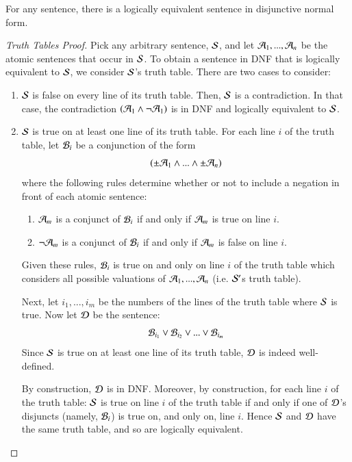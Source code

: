 \documentclass[12pt, a4paper, oneside, openright, titlepage]{book}
\begin{document}
\begin{namthm}
    For any sentence, there is a logically equivalent sentence in disjunctive normal form.
\end{namthm}
\begin{proof}[Truth Tables Proof]
    Pick any arbitrary sentence, $\mathcal{S}$, and let $\mathcal{A}_1,...,\mathcal{A}_n$ be the atomic sentences that occur in $\mathcal{S}$. To obtain a sentence in DNF that is logically equivalent to $\mathcal{S}$, we consider $\mathcal{S}$'s truth table. There are two cases to consider: \begin{enumerate}
        \item $\mathcal{S}$ is false on every line of its truth table. Then, $\mathcal{S}$ is a contradiction. In that case, the contradiction $(\mathcal{A}_1\wedge\neg\mathcal{A}_1)$ is in DNF and logically equivalent to $\mathcal{S}$.
        \item $\mathcal{S}$ is true on at least one line of its truth table. For each line $i$ of the truth table, let $\mathcal{B}_i$ be a conjunction of the form \begin{equation*}
                (\pm\mathcal{A}_1\wedge...\wedge\pm\mathcal{A}_n)
        \end{equation*}
            where the following rules determine whether or not to include a negation in front of each atomic sentence: \begin{enumerate}
                \item $\mathcal{A}_m$ is a conjunct of $\mathcal{B}_i$ if and only if $\mathcal{A}_m$ is true on line $i$.
                \item $\neg \mathcal{A}_m$ is a conjunct of $\mathcal{B}_i$ if and only if $\mathcal{A}_m$ is false on line $i$.
            \end{enumerate}
            Given these rules, $\mathcal{B}_i$ is true on and only on line $i$ of the truth table which considers all possible valuations of $\mathcal{A}_1,...,\mathcal{A}_n$ (i.e. $\mathcal{S}'$s truth table).

            Next, let $i_1,...,i_m$ be the numbers of the lines of the truth table where $\mathcal{S}$ is true. Now let $\mathcal{D}$ be the sentence: \begin{equation*}
                \mathcal{B}_{i_1}\vee\mathcal{B}_{i_2}\vee ...\vee \mathcal{B}_{i_m}
            \end{equation*}
            Since $\mathcal{S}$ is true on at least one line of its truth table, $\mathcal{D}$ is indeed well-defined. 


            By construction, $\mathcal{D}$ is in DNF. Moreover, by construction, for each line $i$ of the truth table: $\mathcal{S}$ is true on line $i$ of the truth table if and only if one of $\mathcal{D}$'s disjuncts (namely, $\mathcal{B}_i$) is true on, and only on, line $i$. Hence $\mathcal{S}$ and $\mathcal{D}$ have the same truth table, and so are logically equivalent.
    \end{enumerate}
\end{proof}
\end{document}
